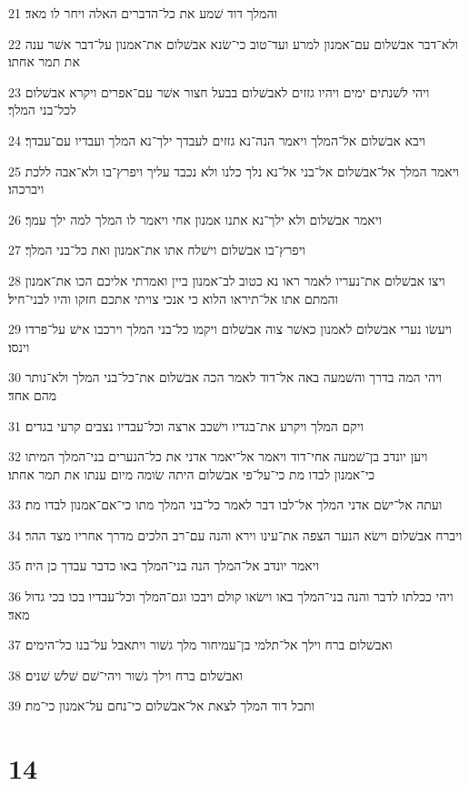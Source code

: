 \par 21 והמלך דוד שׁמע את כל־הדברים האלה ויחר לו מאד׃
\par 22 ולא־דבר אבשׁלום עם־אמנון למרע ועד־טוב כי־שׂנא אבשׁלום את־אמנון על־דבר אשׁר ענה את תמר אחתו׃
\par 23 ויהי לשׁנתים ימים ויהיו גזזים לאבשׁלום בבעל חצור אשׁר עם־אפרים ויקרא אבשׁלום לכל־בני המלך׃
\par 24 ויבא אבשׁלום אל־המלך ויאמר הנה־נא גזזים לעבדך ילך־נא המלך ועבדיו עם־עבדך׃
\par 25 ויאמר המלך אל־אבשׁלום אל־בני אל־נא נלך כלנו ולא נכבד עליך ויפרץ־בו ולא־אבה ללכת ויברכהו׃
\par 26 ויאמר אבשׁלום ולא ילך־נא אתנו אמנון אחי ויאמר לו המלך למה ילך עמך׃
\par 27 ויפרץ־בו אבשׁלום וישׁלח אתו את־אמנון ואת כל־בני המלך׃
\par 28 ויצו אבשׁלום את־נעריו לאמר ראו נא כטוב לב־אמנון ביין ואמרתי אליכם הכו את־אמנון והמתם אתו אל־תיראו הלוא כי אנכי צויתי אתכם חזקו והיו לבני־חיל׃
\par 29 ויעשׂו נערי אבשׁלום לאמנון כאשׁר צוה אבשׁלום ויקמו כל־בני המלך וירכבו אישׁ על־פרדו וינסו׃
\par 30 ויהי המה בדרך והשׁמעה באה אל־דוד לאמר הכה אבשׁלום את־כל־בני המלך ולא־נותר מהם אחד׃
\par 31 ויקם המלך ויקרע את־בגדיו וישׁכב ארצה וכל־עבדיו נצבים קרעי בגדים׃
\par 32 ויען יונדב בן־שׁמעה אחי־דוד ויאמר אל־יאמר אדני את כל־הנערים בני־המלך המיתו כי־אמנון לבדו מת כי־על־פי אבשׁלום היתה שׂומה מיום ענתו את תמר אחתו׃
\par 33 ועתה אל־ישׂם אדני המלך אל־לבו דבר לאמר כל־בני המלך מתו כי־אם־אמנון לבדו מת׃
\par 34 ויברח אבשׁלום וישׂא הנער הצפה את־עינו וירא והנה עם־רב הלכים מדרך אחריו מצד ההר׃
\par 35 ויאמר יונדב אל־המלך הנה בני־המלך באו כדבר עבדך כן היה׃
\par 36 ויהי ככלתו לדבר והנה בני־המלך באו וישׂאו קולם ויבכו וגם־המלך וכל־עבדיו בכו בכי גדול מאד׃
\par 37 ואבשׁלום ברח וילך אל־תלמי בן־עמיחור מלך גשׁור ויתאבל על־בנו כל־הימים׃
\par 38 ואבשׁלום ברח וילך גשׁור ויהי־שׁם שׁלשׁ שׁנים׃
\par 39 ותכל דוד המלך לצאת אל־אבשׁלום כי־נחם על־אמנון כי־מת׃

\chapter{14}

